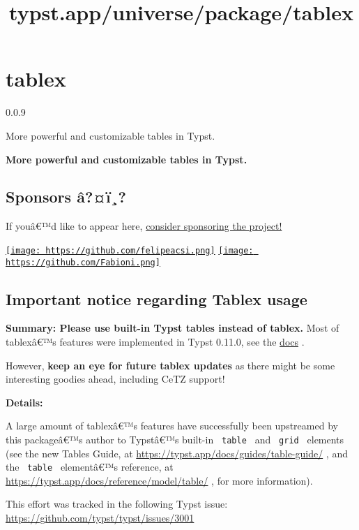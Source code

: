 \title{typst.app/universe/package/tablex}

\label{banner}
\section{tablex}\label{tablex}

{ 0.0.9 }

More powerful and customizable tables in Typst.

\label{readme}
\textbf{More powerful and customizable tables in Typst.}

\subsection{Sponsors â?¤ï¸?}\label{sponsors-uxe2uxef}

If youâ€™d like to appear here,
\href{https://github.com/sponsors/PgBiel}{consider sponsoring the
project!}

\href{https://github.com/felipeacsi}{\texttt{[image: https://github.com/felipeacsi.png]}}
\href{https://github.com/Fabioni}{\texttt{[image: https://github.com/Fabioni.png]}}

\subsection{Important notice regarding Tablex
usage}\label{important-notice-regarding-tablex-usage}

\textbf{Summary: Please use built-in Typst tables instead of tablex.}
Most of tablexâ€™s features were implemented in Typst 0.11.0, see the
\href{https://typst.app/docs/reference/model/table/}{docs} .

However, \textbf{keep an eye for future tablex updates} as there might
be some interesting goodies ahead, including CeTZ support!

\textbf{Details:}

A large amount of tablexâ€™s features have successfully been upstreamed
by this packageâ€™s author to Typstâ€™s built-in \texttt{\ table\ } and
\texttt{\ grid\ } elements (see the new Tables Guide, at
\url{https://typst.app/docs/guides/table-guide/} , and the
\texttt{\ table\ } elementâ€™s reference, at
\url{https://typst.app/docs/reference/model/table/} , for more
information).

This effort was tracked in the following Typst issue:
\url{https://github.com/typst/typst/issues/3001}

